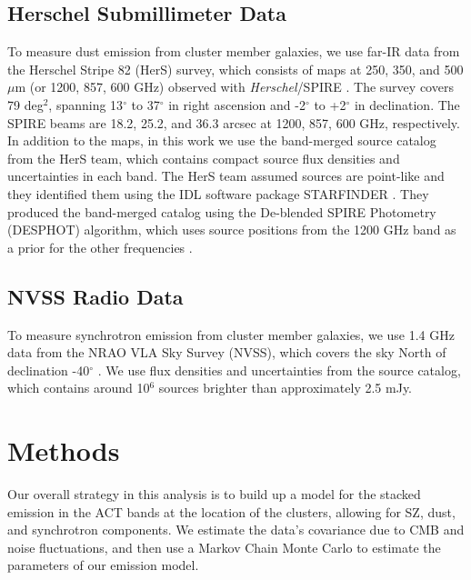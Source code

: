 \documentclass[a4paper,fleqn,usenatbib]{mnras}
\begin{document}
\subsection{Herschel Submillimeter Data}
To measure dust emission from cluster member galaxies, we use far-IR data from the Herschel Stripe 82 (HerS) survey, which consists of maps at 250, 350, and 500 $\mu$m (or 1200, 857, 600 GHz) observed with \textit{Herschel}/SPIRE \citep{2014ApJS..210...22V}. 
The survey covers 79 deg$^2$, spanning 13$^{\circ}$ to 37$^{\circ}$ in right ascension and -2$^{\circ}$ to +2$^{\circ}$ in declination. 
The SPIRE beams are 18.2, 25.2, and 36.3 arcsec at 1200, 857, 600 GHz, respectively. 
In addition to the maps, in this work we use the band-merged source catalog from the HerS team, which contains compact source flux densities and uncertainties in each band. 
The HerS team assumed sources are point-like and they identified them using the IDL software package STARFINDER \citep{2000A&AS..147..335D}. 
They produced the band-merged catalog using the De-blended SPIRE Photometry (DESPHOT) algorithm, which uses source positions from the 1200 GHz band as a prior for the other frequencies \citep{2010MNRAS.409...48R}.

\subsection{NVSS Radio Data}
To measure synchrotron emission from cluster member galaxies, we use 1.4 GHz data from the NRAO VLA Sky Survey (NVSS), which covers the sky North of declination -40$^{\circ}$ \citep{1998AJ....115.1693C}.
We use flux densities and uncertainties from the source catalog, which contains around 10$^6$ sources brighter than approximately 2.5 mJy.


\section{Methods} \label{sec:methods}

Our overall strategy in this analysis is to build up a model for the stacked emission in the ACT bands at the location of the clusters, allowing for SZ, dust, and synchrotron components.  
We estimate the data's covariance due to CMB and noise fluctuations, and then use a Markov Chain Monte Carlo to estimate the parameters of our emission model.
\end{document}
